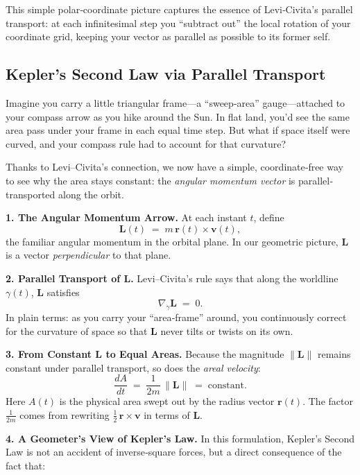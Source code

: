 This simple polar‐coordinate picture captures the essence of Levi‐Civita’s parallel transport: at each infinitesimal step you “subtract out” the local rotation of your coordinate grid, keeping your vector as parallel as possible to its former self.  



\subsection{Kepler’s Second Law via Parallel Transport}

Imagine you carry a little triangular frame—a “sweep‐area” gauge—attached to your compass arrow as you hike around the Sun.  In flat land, you’d see the same area pass under your frame in each equal time step.  But what if space itself were curved, and your compass rule had to account for that curvature?

Thanks to Levi–Civita’s connection, we now have a simple, coordinate‐free way to see why the area stays constant: the \emph{angular momentum vector} is parallel‐transported along the orbit.

\bigskip
\noindent\textbf{1. The Angular Momentum Arrow.}  
At each instant \(t\), define
\[
\mathbf L(t) \;=\; m\,\mathbf r(t)\times \mathbf v(t),
\]
the familiar angular momentum in the orbital plane.  In our geometric picture, \(\mathbf L\) is a vector \emph{perpendicular} to that plane.

\bigskip
\noindent\textbf{2. Parallel Transport of \(\mathbf L\).}  
Levi–Civita’s rule says that along the worldline \(\gamma(t)\), \(\mathbf L\) satisfies
\[
\nabla_{\dot\gamma}\mathbf L \;=\; 0.
\]
In plain terms: as you carry your “area‐frame” around, you continuously correct for the curvature of space so that \(\mathbf L\) never tilts or twists on its own.

\bigskip
\noindent\textbf{3. From Constant \(\mathbf L\) to Equal Areas.}  
Because the magnitude \(\|\mathbf L\|\) remains constant under parallel transport, so does the \emph{areal velocity}:
\[
\frac{dA}{dt}
\;=\;\frac{1}{2m}\,\|\mathbf L\|
\;=\;\text{constant}.
\]
Here \(A(t)\) is the physical area swept out by the radius vector \(\mathbf r(t)\).  The factor \(\tfrac1{2m}\) comes from rewriting \(\tfrac12\,\mathbf r\times\mathbf v\) in terms of \(\mathbf L\).

\bigskip
\noindent\textbf{4. A Geometer’s View of Kepler’s Law.}  
In this formulation, Kepler’s Second Law is not an accident of inverse‐square forces, but a direct consequence of the fact that:

